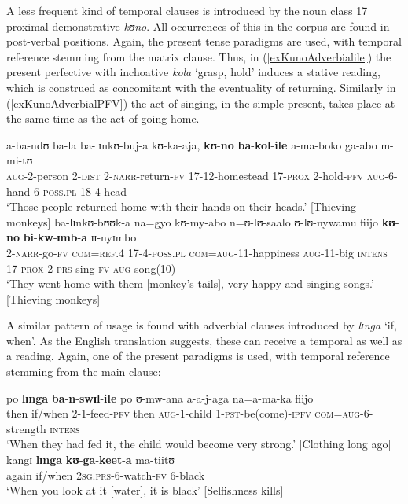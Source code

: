 A less frequent kind of temporal clauses is introduced by the  noun class 17 proximal demonstrative \textit{kʊno}. All occurrences of this in the corpus are found in post-verbal positions. Again, the present tense paradigms are used, with temporal reference stemming from the matrix clause. Thus, in (\ref{exKunoAdverbialile}) the present perfective with inchoative \textit{kola} \lq grasp, hold' induces a stative reading, which is construed as concomitant with the eventuality of returning. Similarly in (\ref{exKunoAdverbialPFV}) the act of singing, in the simple present, takes place at the same time as the act of going home.
\begin{exe}
\ex \label{exKunoAdverbialile} \gll a-ba-ndʊ ba-la ba-lɪnkʊ-buj-a kʊ-ka-aja, \textbf{kʊ}-\textbf{no} \textbf{ba}-\textbf{kol}-\textbf{ile} a-ma-boko ga-abo m-mi-tʊ\\
\textsc{aug}-2-person 2-\textsc{dist} 2-\textsc{narr}-return-\textsc{fv} 17-12-homestead 17-\textsc{prox} 2-hold-\textsc{pfv} \textsc{aug}-6-hand 6-\textsc{poss.pl} 18-4-head\\
\glt `‎‎Those people returned home with their hands on their heads.' [Thieving monkeys]
\ex \label{exKunoAdverbialPFV} \gll ba-lɪnkʊ-bʊʊk-a na=gyo kʊ-my-abo n=ʊ-lʊ-saalo ʊ-lʊ-nywamu fiijo \textbf{kʊ}-\textbf{no} \textbf{bi}-\textbf{kw}-\textbf{ɪmb}-\textbf{a} ɪɪ-nyɪmbo\\
2-\textsc{narr}-go-\textsc{fv} \textsc{com}=\textsc{ref.4} 17-4-\textsc{poss.pl} \textsc{com}=\textsc{aug}-11-happiness \textsc{aug}-11-big \textsc{intens} 17-\textsc{prox} 2-\textsc{prs}-sing-\textsc{fv} \textsc{aug}-song(10)\\
\glt `They went home with them [monkey's tails], very happy and singing songs.' [Thieving monkeys]
\end{exe}

A similar pattern of usage is found with adverbial clauses introduced by \textit{lɪnga} \lq if, when'. As the English translation suggests, these can receive a temporal as well as a  reading. Again, one of the present paradigms is used, with temporal reference stemming from the main clause:

\begin{exe}
\ex \label{exLingaPSTGeneric}
\gll po \textbf{lɪnga} \textbf{ba}-\textbf{n}-\textbf{swɪl}-\textbf{ile} po ʊ-mw-ana a-a-j-aga na=a-ma-ka fiijo\\
then if/when 2-1-feed-\textsc{pfv} then \textsc{aug}-1-child 1-\textsc{pst}-be(come)-\textsc{ipfv} \textsc{com}=\textsc{aug}-6-strength \textsc{intens}\\
\glt \lq When they had fed it, the child would become very strong.' [Clothing long ago]
\ex \gll kangɪ \textbf{lɪnga} \textbf{kʊ}-\textbf{ga}-\textbf{keet}-\textbf{a} ma-tiitʊ\\
again if/when \textsc{2sg.prs}-6-watch-\textsc{fv} 6-black\\
\glt \lq When you look at it [water], it is black' [Selfishness kills]
\end{exe}

